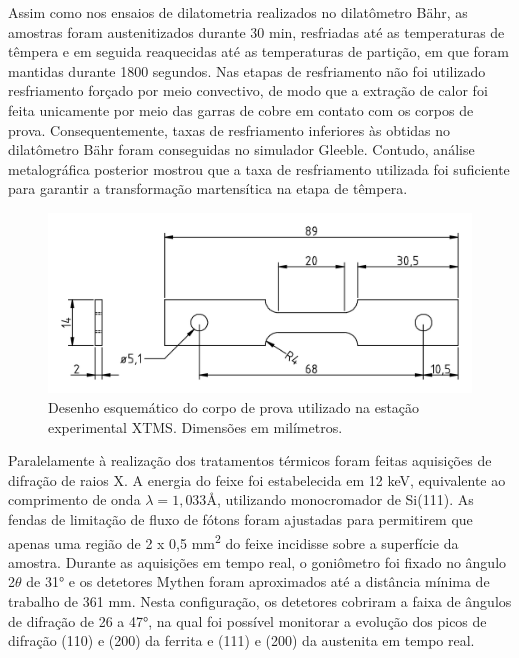 
Assim como nos ensaios de dilatometria realizados no dilatômetro Bähr, as amostras foram austenitizados durante 30 min, resfriadas até as temperaturas de têmpera e em seguida reaquecidas até as temperaturas de partição, em que foram mantidas durante 1800 segundos. Nas etapas de resfriamento não foi utilizado resfriamento forçado por meio convectivo, de modo que a extração de calor foi feita unicamente por meio das garras de cobre em contato com os corpos de prova. Consequentemente, taxas de resfriamento inferiores às obtidas no dilatômetro Bähr foram conseguidas no simulador Gleeble. Contudo, análise metalográfica posterior mostrou que a taxa de resfriamento utilizada foi suficiente para garantir a transformação martensítica na etapa de têmpera.

\begin{figure}
	\includegraphics[width=14cm]{img/CPXTMS.pdf}
	\caption{Desenho esquemático do corpo de prova utilizado na estação experimental XTMS. Dimensões em  milímetros.}
	\label{fig:CPXTMS}
\end{figure}

Paralelamente à realização dos tratamentos térmicos foram feitas aquisições de difração de raios X. A energia do feixe foi estabelecida em 12 keV, equivalente ao comprimento de onda $\lambda = 1,033\text{\AA}$, utilizando monocromador de Si(111). As fendas de limitação de fluxo de fótons foram ajustadas para permitirem que apenas uma região de 2 x 0,5 mm\textsuperscript{2} do feixe incidisse sobre a superfície da amostra. Durante as aquisições em tempo real, o goniômetro foi fixado no ângulo 2$\theta$ de 31° e os detetores Mythen foram aproximados até a distância mínima de trabalho de 361 mm. Nesta configuração, os detetores cobriram a faixa de ângulos de difração de 26 a 47°, na qual foi possível monitorar a evolução dos picos de difração (110) e (200) da ferrita e (111) e (200) da austenita em tempo real.

